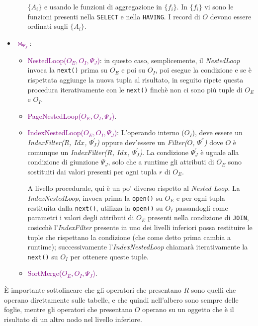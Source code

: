 \begin{itemize}
\begin{itemize}
                $\{A_i\}$ e usando le funzioni di aggregazione in $\{f_i\}$. In $\{f_i\}$ vi sono le funzioni presenti
                nella \verb|SELECT| e nella \verb|HAVING|. I record di $O$ devono essere ordinati sugli $\{A_i\}$.
        \end{itemize}
    \item \textbf{\textcolor{purple}{$\bowtie_{\Psi_J}$}}:
        \begin{itemize}
            \item \textcolor{purple}{NestedLoop($O_E, O_I, \Psi_J$)}: in questo caso, semplicemente,
                il \emph{NestedLoop} invoca la \verb|next()| prima su $O_E$ e poi su $O_I$, poi esegue
                la condizione e se è rispettata aggiunge la nuova tupla al risultato, in seguito ripete questa
                procedura iterativamente con le \verb|next()| finchè non ci sono più tuple di $O_E$ e $O_I$.
            \item \textcolor{purple}{PageNestedLoop($O_E, O_I, \Psi_J$)}.
            \item \textcolor{purple}{IndexNestedLoop($O_E, O_I, \Psi_J$)}: L'operando interno ($O_I$), deve essere un \emph{IndexFilter($R$, $Idx$, $\Psi^{'}_J$)}
                oppure dev'essere un \emph{Filter($O$, $\Psi^{''}$)} dove $O$ è comunque
                un \emph{IndexFilter($R$, $Idx$, $\Psi^{'}_J$)}. La condizione $\Psi^{'}_J$ è uguale
                alla condizione di giunzione $\Psi_J$, solo che a runtime gli attributi di $O_E$ sono sostituiti
                dai valori presenti per ogni tupla $r$ di $O_E$.
                
                A livello procedurale, qui è un po' diverso rispetto al \emph{Nested Loop}. La \emph{IndexNestedLoop},
                invoca prima la \verb|open()| su $O_E$ e per ogni tupla restituita dalla \verb|next()|,
                utilizza la \verb|open()| su $O_I$ passandogli come parametri i valori degli attributi di $O_E$ presenti
                nella condizione di \verb|JOIN|, cosicchè l'\emph{IndexFilter} presente in uno dei livelli inferiori
                possa restituire le tuple che rispettano la condizione (che come detto prima cambia a runtime); successivamente
                l'\emph{IndexNestedLoop} chiamarà iterativamente la \verb|next()| su $O_I$ per ottenere queste tuple.
            \item \textcolor{purple}{SortMerge($O_E, O_I, \Psi_J$)}.
        \end{itemize}
\end{itemize}

È importante sottolineare che gli operatori che presentano $R$ sono quelli
che operano direttamente sulle tabelle, e che quindi nell'albero sono sempre delle
foglie, mentre gli operatori che presentano $O$ operano su un oggetto che è il risultato
di un altro nodo nel livello inferiore.